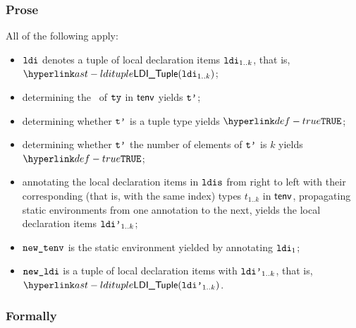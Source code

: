 \subsubsection{Prose}
All of the following apply:
\begin{itemize}
  \item $\ldi$ denotes a tuple of local declaration items $\ldi_{1..k}$, that is, $\LDITuple(\ldi_{1..k})$;
  \item determining the \structure\ of $\tty$ in $\tenv$ yields $\vtp$\ProseOrTypeError;
  \item determining whether $\vtp$ is a tuple type yields $\True$\ProseOrTypeError;
  \item determining whether $\vtp$ the number of elements of $\vtp$ is $k$ yields $\True$\ProseOrTypeError;
  \item annotating the local declaration items in $\ldis$ from right to left with their corresponding
        (that is, with the same index) types $t_{1..k}$ in $\tenv$,
        propagating static environments from one annotation to the next,
        yields the local declaration items $\ldip_{1..k}$\ProseOrTypeError;
  \item $\newtenv$ is the static environment yielded by annotating $\ldi_1$;
  \item $\newldi$ is a tuple of local declaration items with $\ldip_{1..k}$, that is, \\
        $\LDITuple(\ldip_{1..k})$.
\end{itemize}
\subsubsection{Formally}
\begin{mathpar}
\end{mathpar}

